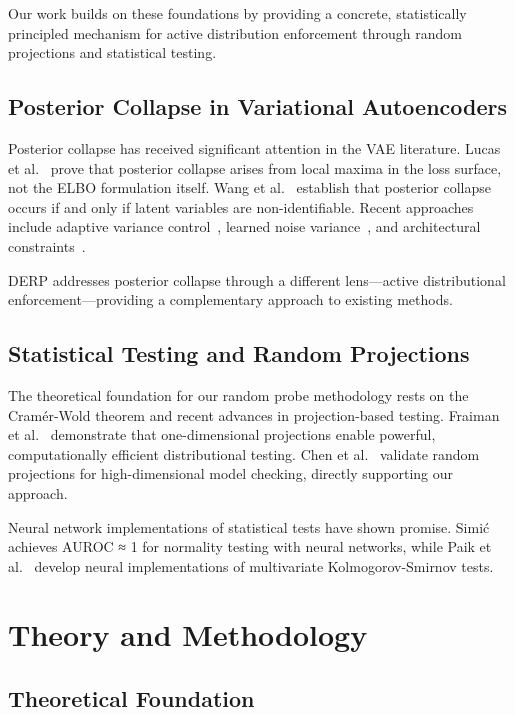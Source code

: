 \documentclass{article}
\begin{document}
Our work builds on these foundations by providing a concrete, statistically principled mechanism for active distribution enforcement through random projections and statistical testing.

\subsection{Posterior Collapse in Variational Autoencoders}

Posterior collapse has received significant attention in the VAE literature. Lucas et al.~\cite{lucas2019} prove that posterior collapse arises from local maxima in the loss surface, not the ELBO formulation itself. Wang et al.~\cite{wang2023} establish that posterior collapse occurs if and only if latent variables are non-identifiable. Recent approaches include adaptive variance control~\cite{takida2022}, learned noise variance~\cite{lin2019}, and architectural constraints~\cite{song2024}.

DERP addresses posterior collapse through a different lens—active distributional enforcement—providing a complementary approach to existing methods.

\subsection{Statistical Testing and Random Projections}

The theoretical foundation for our random probe methodology rests on the Cramér-Wold theorem and recent advances in projection-based testing. Fraiman et al.~\cite{fraiman2021, fraiman2022} demonstrate that one-dimensional projections enable powerful, computationally efficient distributional testing. Chen et al.~\cite{chen2024} validate random projections for high-dimensional model checking, directly supporting our approach.

Neural network implementations of statistical tests have shown promise. Simić~\cite{simic2020} achieves AUROC ≈ 1 for normality testing with neural networks, while Paik et al.~\cite{paik2023} develop neural implementations of multivariate Kolmogorov-Smirnov tests.

\section{Theory and Methodology}

\subsection{Theoretical Foundation}
\end{document}
